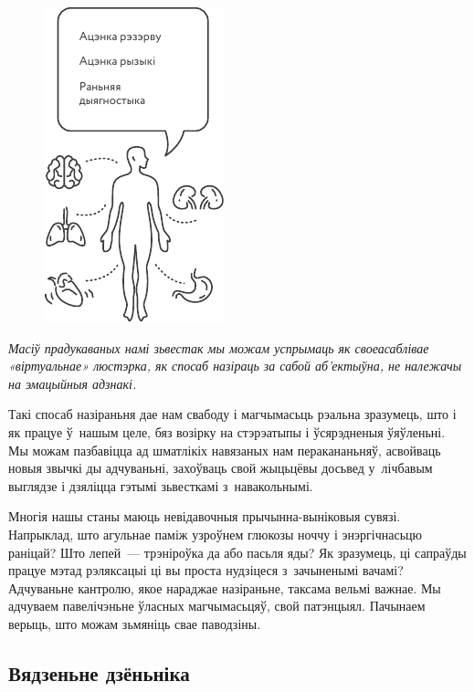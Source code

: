 \begin{figure}[htb!]
  \centering
  \includegraphics[scale=1.5]{willpower/ch3/2.pdf}
\end{figure}

\emph{Масіў прадукаваных намі зьвестак мы можам успрымаць як своеасаблівае «віртуальнае» люстэрка, як спосаб назіраць за сабой аб'ектыўна, не належачы на эмацыйныя адзнакі.}

Такі спосаб назіраньня дае нам свабоду і магчымасьць рэальна зразумець, што і як працуе ў~нашым целе, бяз возірку на стэрэатыпы і ўсярэдненыя ўяўленьні. Мы можам пазбавіцца ад шматлікіх навязаных нам перакананьняў, асвойваць новыя звычкі ды адчуваньні, захоўваць свой жыцьцёвы досьвед у~лічбавым выглядзе і дзяліцца гэтымі зьвесткамі з~навакольнымі.

Многія нашы станы маюць невідавочныя прычынна-выніковыя сувязі. Напрыклад, што агульнае паміж узроўнем глюкозы ноччу і энэргічнасьцю раніцай? Што лепей~--- трэніроўка да або пасьля яды? Як зразумець, ці сапраўды працуе мэтад рэляксацыі ці вы проста нудзіцеся з~зачыненымі вачамі? Адчуваньне кантролю, якое нараджае назіраньне, таксама вельмі важнае. Мы адчуваем павелічэньне ўласных магчымасьцяў, свой патэнцыял. Пачынаем верыць, што можам зьмяніць свае паводзіны. 


\subsection*{Вядзеньне дзёньніка}

